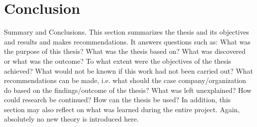 \documentclass[11pt,a4paper,oneside,article]{memoir}
\begin{document}
\chapter{Conclusion}

Summary and Conclusions. This section summarizes the thesis and its
objectives and results and makes recommendations. It answers
questions such as: What was the purpose of this thesis? What was the
thesis based on? What was discovered or what was the outcome? To
what extent were the objectives of the thesis achieved? What would not
be known if this work had not been carried out? What recommendations
can be made, i.e. what should the case company/organization do based
on the findings/outcome of the thesis? What was left unexplained? How
could research be continued? How can the thesis be used? In addition,
this section may also reflect on what was learned during the entire
project. Again, absolutely no new theory is introduced here.
\end{document}
